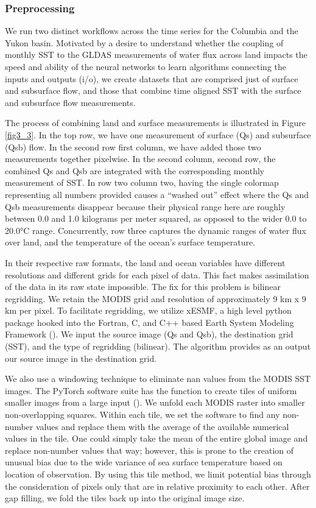 \begin{refsection}
\subsubsection{Preprocessing}
We run two distinct workflows across the time series for the Columbia and the Yukon basin. Motivated by a desire to understand whether the coupling of monthly SST to the GLDAS measurements of water flux across land impacts the speed and ability of the neural networks to learn algorithms connecting the inputs and outputs (i/o), we create datasets that are comprised just of surface and subsurface flow, and those that combine time aligned SST with the surface and subsurface flow measurements. 

The process of combining land and surface measurements is illustrated in Figure \ref{fig3_3}. In the top row, we have one measurement of surface (Qs) and subsurface (Qsb) flow. In the second row first column, we have added those two measurements together pixelwise. In the second column, second row, the combined Qs and Qsb are integrated with the corresponding monthly measurement of SST. In row two column two, having the single colormap representing all numbers provided causes a “washed out” effect where the Qs and Qsb measurements disappear because their physical range here are roughly between 0.0 and 1.0 kilograms per meter squared, as opposed to the wider 0.0 to 20.0°C range. Concurrently, row three captures the dynamic ranges of water flux over land, and the temperature of the ocean’s surface temperature.

In their respective raw formats, the land and ocean variables have different resolutions and different grids for each pixel of data. This fact makes assimilation of the data in its raw state impossible. The fix for this problem is bilinear regridding. We retain the MODIS grid and resolution of approximately 9 km x 9 km per pixel. To facilitate regridding, we utilize xESMF, a high level python package hooked into the Fortran, C, and C++ based Earth System Modeling Framework (\cite{zhuang2019xesmf}). We input the source image (Qs and Qsb), the destination grid (SST), and the type of regridding (bilinear). The algorithm provides as an output our source image in the destination grid.

We also use a windowing technique to eliminate nan values from the MODIS SST images. The PyTorch software suite has the function to create tiles of uniform smaller images from a large input (\cite{paszke2019pytorch}). We unfold each MODIS raster into smaller non-overlapping squares. Within each tile, we set the software to find any non-number values and replace them with the average of the available numerical values in the tile. One could simply take the mean of the entire global image and replace non-number values that way; however, this is prone to the creation of unusual bias due to the wide variance of sea surface temperature based on location of observation. By using this tile method, we limit potential bias through the consideration of pixels only that are in relative proximity to each other. After gap filling, we fold the tiles back up into the original image size.


\end{refsection}
